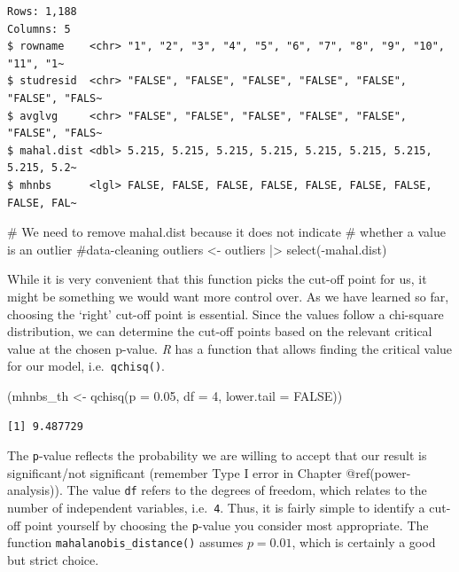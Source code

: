 \documentclass[
  letterpaper,
]{krantz}
\makeatletter
\newenvironment{Shaded}{\begin{snugshade}}{\end{snugshade}}
\newcommand{\AttributeTok}[1]{\textcolor[rgb]{0.40,0.45,0.13}{#1}}
\newcommand{\CommentTok}[1]{\textcolor[rgb]{0.37,0.37,0.37}{#1}}
\newcommand{\ConstantTok}[1]{\textcolor[rgb]{0.56,0.35,0.01}{#1}}
\newcommand{\DecValTok}[1]{\textcolor[rgb]{0.68,0.00,0.00}{#1}}
\newcommand{\FloatTok}[1]{\textcolor[rgb]{0.68,0.00,0.00}{#1}}
\newcommand{\FunctionTok}[1]{\textcolor[rgb]{0.28,0.35,0.67}{#1}}
\newcommand{\NormalTok}[1]{\textcolor[rgb]{0.00,0.23,0.31}{#1}}
\newcommand{\OtherTok}[1]{\textcolor[rgb]{0.00,0.23,0.31}{#1}}
\newcommand{\SpecialCharTok}[1]{\textcolor[rgb]{0.37,0.37,0.37}{#1}}
\newenvironment{kframe}{%
\medskip{}
\setlength{\fboxsep}{.8em}
 \def\at@end@of@kframe{}%
 \ifinner\ifhmode%
  \def\at@end@of@kframe{\end{minipage}}%
  \begin{minipage}{\columnwidth}%
 \fi\fi%
 \def\FrameCommand##1{\hskip\@totalleftmargin \hskip-\fboxsep
 \colorbox{shadecolor}{##1}\hskip-\fboxsep
     \hskip-\linewidth \hskip-\@totalleftmargin \hskip\columnwidth}%
 \MakeFramed {\advance\hsize-\width
   \@totalleftmargin\z@ \linewidth\hsize
   \@setminipage}}%
 {\par\unskip\endMakeFramed%
 \at@end@of@kframe}
\renewenvironment{Shaded}{\begin{kframe}}{\end{kframe}}
\makeatother
\begin{document}
\begin{verbatim}
Rows: 1,188
Columns: 5
$ rowname    <chr> "1", "2", "3", "4", "5", "6", "7", "8", "9", "10", "11", "1~
$ studresid  <chr> "FALSE", "FALSE", "FALSE", "FALSE", "FALSE", "FALSE", "FALS~
$ avglvg     <chr> "FALSE", "FALSE", "FALSE", "FALSE", "FALSE", "FALSE", "FALS~
$ mahal.dist <dbl> 5.215, 5.215, 5.215, 5.215, 5.215, 5.215, 5.215, 5.215, 5.2~
$ mhnbs      <lgl> FALSE, FALSE, FALSE, FALSE, FALSE, FALSE, FALSE, FALSE, FAL~
\end{verbatim}

\begin{Shaded}
\begin{Highlighting}[]
\CommentTok{\# We need to remove mahal.dist because it does not indicate}
\CommentTok{\# whether a value is an outlier \#data{-}cleaning}
\NormalTok{outliers }\OtherTok{\textless{}{-}}\NormalTok{ outliers }\SpecialCharTok{|\textgreater{}} \FunctionTok{select}\NormalTok{(}\SpecialCharTok{{-}}\NormalTok{mahal.dist)}
\end{Highlighting}
\end{Shaded}

While it is very convenient that this function picks the cut-off point
for us, it might be something we would want more control over. As we
have learned so far, choosing the `right' cut-off point is essential.
Since the values follow a chi-square distribution, we can determine the
cut-off points based on the relevant critical value at the chosen
p-value. \emph{R} has a function that allows finding the critical value
for our model, i.e.~\texttt{qchisq()}.

\begin{Shaded}
\begin{Highlighting}[]
\NormalTok{(mhnbs\_th }\OtherTok{\textless{}{-}} \FunctionTok{qchisq}\NormalTok{(}\AttributeTok{p =} \FloatTok{0.05}\NormalTok{,}
                   \AttributeTok{df =} \DecValTok{4}\NormalTok{,}
                   \AttributeTok{lower.tail =} \ConstantTok{FALSE}\NormalTok{))}
\end{Highlighting}
\end{Shaded}

\begin{verbatim}
[1] 9.487729
\end{verbatim}

The \texttt{p}-value reflects the probability we are willing to accept
that our result is significant/not significant (remember Type I error in
Chapter @ref(power-analysis)). The value \texttt{df} refers to the
degrees of freedom, which relates to the number of independent
variables, i.e.~\texttt{4}. Thus, it is fairly simple to identify a
cut-off point yourself by choosing the \texttt{p}-value you consider
most appropriate. The function \texttt{mahalanobis\_distance()} assumes
\(p = 0.01\), which is certainly a good but strict choice.
\end{document}
